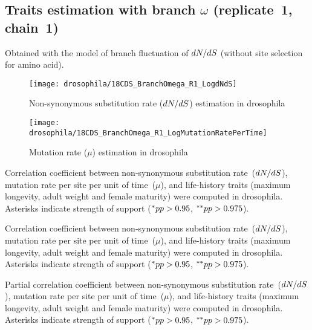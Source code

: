 \subsection{Traits estimation with branch \texorpdfstring{$\omega$}{ω} (replicate~1, chain~1)}
Obtained with the model of branch fluctuation of $\dnds$ (without site selection for amino acid).

\begin{figure}[H]
    \centering
    \texttt{[image: drosophila/18CDS\_BranchOmega\_R1\_LogdNdS]}
    \caption[Non-synonymous {substitution} rate estimation in drosophila]{Non-synonymous {substitution} rate ($\dnds$) estimation in drosophila}
\end{figure}

\begin{figure}[H]
    \centering
    \texttt{[image: drosophila/18CDS\_BranchOmega\_R1\_LogMutationRatePerTime]}
    \caption[Mutation rate estimation in drosophila]{Mutation rate ($\mu$) estimation in drosophila}
\end{figure}


\begin{table}[H]
    
    \caption[Correlation coefficient matrix in drosophila ($\dnds$)]{
    Correlation coefficient between non-synonymous substitution rate~($\dnds$), mutation rate per site per unit of time~($\mu$), and life-history traits (maximum longevity, adult weight and female maturity) were computed in drosophila.
    Asterisks indicate strength of support ($\smash{^{*}} pp > 0.95$, $\smash{^{**}} pp > 0.975$).}
\end{table}

\begin{table}[H]
    
    \caption[Covariance matrix in drosophila ($\dnds$)]{
    Correlation coefficient between non-synonymous substitution rate~($\dnds$), mutation rate per site per unit of time~($\mu$), and life-history traits (maximum longevity, adult weight and female maturity) were computed in drosophila.
    Asterisks indicate strength of support ($\smash{^{*}} pp > 0.95$, $\smash{^{**}} pp > 0.975$).}
\end{table}

\begin{table}[H]
    
    \caption[Partial correlation coefficient matrix in drosophila ($\dnds$)]{
    Partial correlation coefficient between non-synonymous substitution rate~($\dnds$), mutation rate per site per unit of time~($\mu$), and life-history traits (maximum longevity, adult weight and female maturity) were computed in drosophila.
    Asterisks indicate strength of support ($\smash{^{*}} pp > 0.95$, $\smash{^{**}} pp > 0.975$).}
\end{table}



